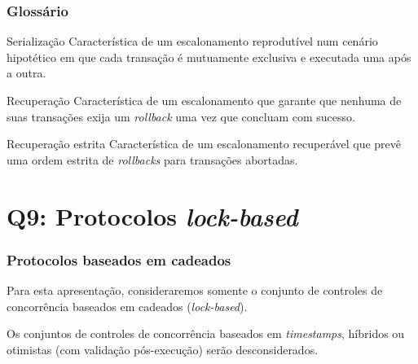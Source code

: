 \documentclass{beamer}
\begin{document}
\begin{frame}
    \frametitle{Glossário}

    \begin{block}{Serialização}
        Característica de um escalonamento reprodutível num cenário hipotético em que cada transação é mutuamente exclusiva e executada uma após a outra.
    \end{block}
    \begin{block}{Recuperação}
        Característica de um escalonamento que garante que nenhuma de suas transações exija um \emph{rollback} uma vez que concluam com sucesso.
       \end{block}
    \begin{block}{Recuperação estrita}
        Característica de um escalonamento recuperável que prevê uma ordem estrita de \emph{rollbacks} para transações abortadas.
    \end{block}
\end{frame}

\section{Q9: Protocolos \emph{lock-based}}

\begin{frame}
    \frametitle{Protocolos baseados em cadeados}

    Para esta apresentação, consideraremos somente o conjunto de controles de concorrência baseados em cadeados (\emph{lock-based}).

    \medskip

    \newblock        
    Os conjuntos de controles de concorrência baseados em \emph{timestamps}, híbridos ou otimistas (com validação pós-execução) serão desconsiderados.
\end{frame}

\end{document}
